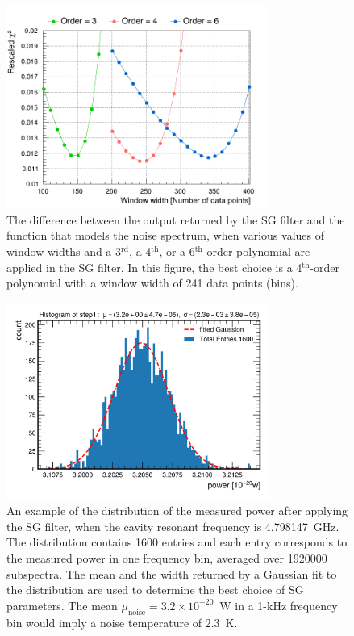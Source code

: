 \begin{figure} [htbp]
  \centering
  \includegraphics[width=8.6cm]{figures/chi2_Different_Order_Window_SGFilter.png}
  \caption{The difference between the output returned by the SG filter 
  and the function that models the noise spectrum, when various values of 
  window widths and 
  a 3$^\text{rd}$, a 4$^\text{th}$, or a 
  6$^\text{th}$-order polynomial are applied in the SG filter. In this 
  figure, the best choice is a 4$^\text{th}$-order polynomial with 
  a window width of 241 data points (bins). }
  \label{fig:sgoptimize}
\end{figure}
 


\begin{figure} [htbp]
  \centering
  \includegraphics[width=8.6cm]{figures/sysSG_temphistogram.png}
  \caption{An example of the distribution of the measured power after 
applying the SG filter, when 
the cavity resonant frequency is 4.798147~GHz. The distribution contains 
1600 entries and each entry corresponds to the measured power 
in one frequency bin, averaged
over 1920000 subspectra. The mean and the width returned by 
a Gaussian fit to the distribution are used to determine the best choice of 
SG parameters. The mean $\mu_\text{noise}=3.2\times10^{-20}$~W in 
a 1-kHz frequency bin would imply a noise temperature of 2.3~K.}
  \label{fig:noisegauss}
\end{figure}
 

